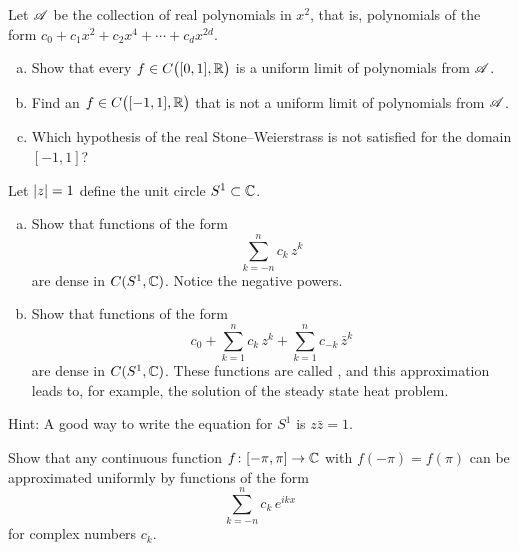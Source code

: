 \begin{exercise}
Let ${\mathscr{A}}$ be the collection of real polynomials in $x^2$,
that is, polynomials of the form
$c_0 + c_1 x^2 + c_2 x^4 + \cdots + c_d x^{2d}$.
\begin{enumerate}[a)]
\item
Show that every $f \in C\bigl([0,1],{\mathbb{R}}\bigr)$ is a uniform limit of
polynomials from ${\mathscr{A}}$.
\item
Find an $f \in  C\bigl([-1,1],{\mathbb{R}}\bigr)$ that is not a
uniform limit of
polynomials from ${\mathscr{A}}$.
\item
Which hypothesis of the real Stone--Weierstrass is not satisfied
for the domain $[-1,1]$?
\end{enumerate}
\end{exercise}

\begin{exercise}
\pagebreak[3]
Let $\lvert {z} \rvert=1$ define the unit circle $S^1 \subset {\mathbb{C}}$.
\begin{enumerate}[a)]
\item
Show that functions of the form
\begin{equation*}
\sum_{k=-n}^n c_k\, z^k
\end{equation*}
are dense in $C(S^1,{\mathbb{C}})$.  Notice the negative powers.
\item 
Show that functions of the form
\begin{equation*}
c_0
+
\sum_{k=1}^n c_k \, z^k
+
\sum_{k=1}^n c_{-k}\, \bar{z}^k
\end{equation*}
are dense in $C(S^1,{\mathbb{C}})$.
These functions are called \emph{},
and this approximation leads to, for example, the solution of the
steady state heat problem.
\end{enumerate}
Hint: A good way to write the equation for $S^1$ is $z \bar{z} = 1$.
\end{exercise}

\begin{exercise} \label{exercise:trigpolydense}
Show that any continuous function $f \colon [-\pi,\pi] \to {\mathbb{C}}$
with $f(-\pi)=f(\pi)$ can be approximated uniformly by
functions of the form
\begin{equation*}
\sum_{k=-n}^n c_k \, e^{ik x}
\end{equation*}
for complex numbers $c_k$.
\end{exercise}

